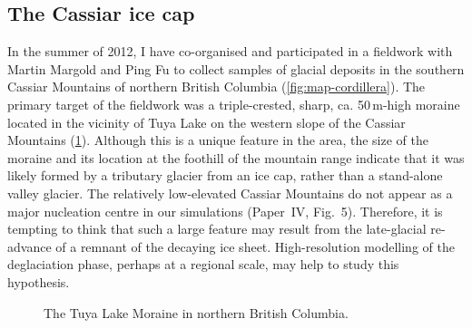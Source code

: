\documentclass{article}
\newcommand{\CCYC}[0]{Paper~IV}     %
\begin{document}
\subsection{The Cassiar ice cap}

In the summer of 2012, I have co-organised and participated in a fieldwork with
Martin Margold and Ping Fu to collect samples of glacial deposits in the
southern Cassiar Mountains of northern British Columbia
(\cref{fig:map-cordillera}). The primary target of the fieldwork was a
triple-crested, sharp, ca. 50\,m-high moraine located in the vicinity of Tuya
Lake on the western slope of the Cassiar Mountains
(\cref{fig:photo-tuya-moraine}). Although this is a unique feature in the area,
the size of the moraine and its location at the foothill of the mountain range
indicate that it was likely formed by a tributary glacier from an ice cap,
rather than a stand-alone valley glacier. The relatively low-elevated Cassiar
Mountains do not appear as a major nucleation centre in our simulations (\CCYC,
Fig.~5). Therefore, it is tempting to think that such a large feature may
result from the late-glacial re-advance of a remnant of the decaying ice sheet.
High-resolution modelling of the deglaciation phase, perhaps at a regional
scale, may help to study this hypothesis.

\begin{figure}
  \centering
  \caption{The Tuya Lake Moraine in northern British Columbia.}
  \label{fig:photo-tuya-moraine}
\end{figure}

\renewcommand{\urlprefix}[0]{}  %



\end{document}

